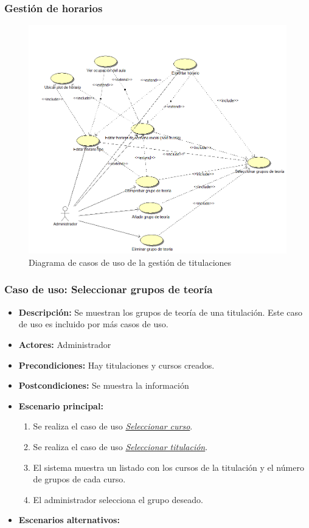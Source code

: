 \documentclass{book}
\begin{document}
\subsubsection{Gestión de horarios}
\begin{figure}[H] 
  \label{gestion-horarios} 
	\begin{center}
    \includegraphics[scale=0.5]{./gestionhorarios.png}
  \end{center}
\caption{Diagrama de casos de uso de la gestión de titulaciones}
\end{figure}

\subsubsection*{Caso de uso: Seleccionar grupos de teoría}
\label{select_grupo}
\begin{itemize}
\item{\bf Descripción:} Se muestran los grupos de teoría de una titulación. Este caso de uso es incluido por más casos de uso.
\item{\bf Actores:} Administrador
\item{\bf Precondiciones:} Hay titulaciones y cursos creados.
\item{\bf Postcondiciones:} Se muestra la información
\item{\bf Escenario principal:}
	\begin{enumerate}
	\item Se realiza el caso de uso {\em \hyperref[select_curso]{Seleccionar curso}}.
	\item Se realiza el caso de uso {\em \hyperref[select_titulacion]{Seleccionar titulación}}.
	\item El sistema muestra un listado con los cursos de la titulación y el número de grupos de cada curso.
	\item El administrador selecciona el grupo deseado.
	\end{enumerate}
\item{\bf Escenarios alternativos:}
\end{itemize}
\end{document}

